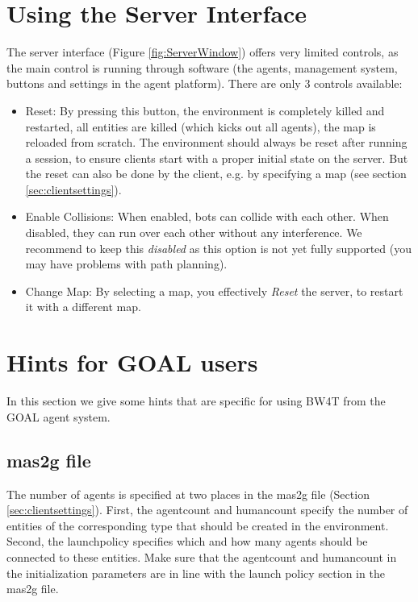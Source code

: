 \documentclass[11pt,a4paper]{article}
\begin{document}
\section{Using the Server Interface}
The server interface (Figure \ref{fig:ServerWindow}) offers very limited controls, as the main control is running through software (the agents, management system, buttons and settings in the agent platform). There are only 3 controls available:
\begin{itemize}
\item{Reset}: By pressing this button, the environment is completely killed and restarted, all entities are killed (which kicks out all agents), the map is reloaded from scratch. The environment should always be reset after running a session, to ensure clients start with a proper initial state on the server. But the reset can also be done by the client, e.g. by specifying a map (see section \ref{sec:clientsettings}).
\item{Enable Collisions}: When enabled, bots can collide with each other. When disabled, they can run over each other without any interference. We recommend to keep this \emph{disabled} as this option is not yet fully supported (you may have problems with path planning).
\item{Change Map}: By selecting a map, you effectively \emph{Reset} the server, to restart it with a different map.
\end{itemize}








\section{Hints for GOAL users}
In this section we give some hints that are specific for using BW4T from the GOAL agent system.

\subsection{mas2g file}
The number of agents is specified at two places in the mas2g file (Section \ref{sec:clientsettings}). First, the agentcount and humancount specify the number of entities of the corresponding type that should be created in the environment. Second, the launchpolicy specifies which and how many agents should be connected to these entities. Make sure that the agentcount and humancount in the initialization parameters are in line with the launch policy section in the mas2g file. 
\end{document}
